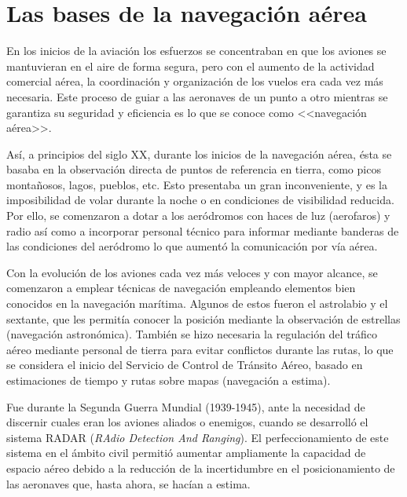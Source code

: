 \chapter{Las bases de la navegación aérea}
\label{chap:BasesNavegacionAerea}

En los inicios de la aviación los esfuerzos se concentraban en que los aviones se mantuvieran en el aire de forma segura, pero con el aumento de la actividad comercial aérea, la coordinación y organización de los vuelos era cada vez más necesaria. Este proceso de guiar a las aeronaves de un punto a otro mientras se garantiza su seguridad y eficiencia es lo que se conoce como <<navegación aérea>>.

Así, a principios del siglo XX, durante los inicios de la navegación aérea, ésta se basaba en la observación directa de puntos de referencia en tierra, como picos montañosos, lagos, pueblos, etc. Esto presentaba un gran inconveniente, y es la imposibilidad de volar durante la noche o en condiciones de visibilidad reducida. Por ello, se comenzaron a dotar a los aeródromos con haces de luz (aerofaros) y radio así como a incorporar personal técnico para informar mediante banderas de las condiciones del aeródromo lo que aumentó la comunicación por vía aérea.

Con la evolución de los aviones cada vez más veloces y con mayor alcance, se comenzaron a emplear técnicas de navegación empleando elementos bien conocidos en la navegación marítima. Algunos de estos fueron el astrolabio y el sextante, que les permitía conocer la posición mediante la observación de estrellas (navegación astronómica). También se hizo necesaria la regulación del tráfico aéreo mediante personal de tierra para evitar conflictos durante las rutas, lo que se considera el inicio del Servicio de Control de Tránsito Aéreo, basado en estimaciones de tiempo y rutas sobre mapas (navegación a estima).

Fue durante la Segunda Guerra Mundial (1939-1945), ante la necesidad de discernir cuales eran los aviones aliados o enemigos, cuando se desarrolló el sistema RADAR (\textit{RAdio Detection And Ranging}). El perfeccionamiento de este sistema en el ámbito civil permitió aumentar ampliamente la capacidad de espacio aéreo debido a la reducción de la incertidumbre en el posicionamiento de las aeronaves que, hasta ahora, se hacían a estima.

